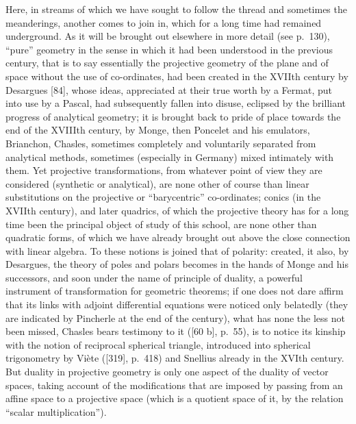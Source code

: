Here, in streams of which we have sought to follow the thread and sometimes the meanderings, another comes to join in, which for a long time had remained underground. As it will be brought out elsewhere in more detail (see p.~130), ``pure'' geometry in the sense in which it had been understood in the previous century, that is to say essentially the projective geometry of the plane and of space without the use of co-ordinates, had been created in the XVIIth century by Desargues {[}84{]}, whose ideas, appreciated at their true worth by a Fermat, put into use by a Pascal, had subsequently fallen into disuse, eclipsed by the brilliant progress of analytical geometry; it is brought back to pride of place towards the end of the XVIIIth century, by Monge, then Poncelet and his emulators, Brianchon, Chasles, sometimes completely and voluntarily separated from analytical methods, sometimes (especially in Germany) mixed intimately with them. Yet projective transformations, from whatever point of view they are considered (synthetic or analytical), are none other of course than linear substitutions on the projective or ``barycentric'' co-ordinates; conics (in the XVIIth century), and later quadrics, of which the projective theory has for a long time been the principal object of study of this school, are none other than quadratic forms, of which we have already brought out above the close connection with linear algebra. To these notions is joined that of polarity: created, it also, by Desargues, the theory of poles and polars becomes in the hands of Monge and his successors, and soon under the name of principle of duality, a powerful instrument of transformation for geometric theorems; if one does not dare affirm that its links with adjoint differential equations were noticed only belatedly (they are indicated by Pincherle at the end of the century), what has none the less not been missed, Chasles bears testimony to it ({[}60 b{]}, p.~55), is to notice its kinship with the notion of reciprocal spherical triangle, introduced into spherical trigonometry by Viète ({[}319{]}, p.~418) and Snellius already in the XVIth century. But duality in projective geometry is only one aspect of the duality of vector spaces, taking account of the modifications that are imposed by passing from an affine space to a projective space (which is a quotient space of it, by the relation ``scalar multiplication'').

